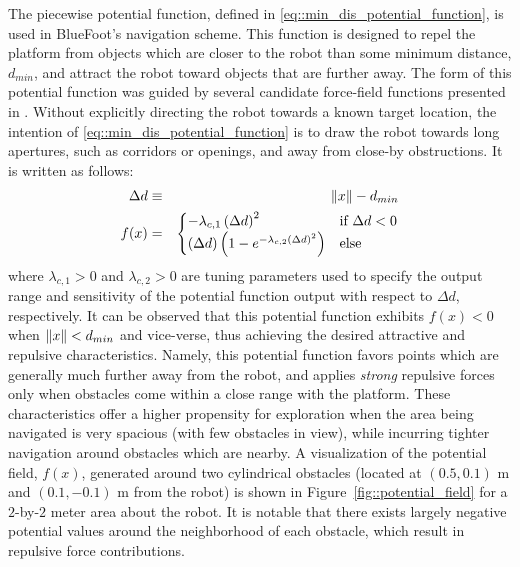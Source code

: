			The piecewise potential function, defined in \ref{eq::min_dis_potential_function}, is used in BlueFoot's navigation scheme. This function is designed to repel the platform from objects which are closer to the robot than some minimum distance, $d_{min}$, and attract the robot toward objects that are further away. The form of this potential function was guided by several candidate force-field functions presented in \cite{ArambulaCosio2004}. Without explicitly directing the robot towards a known target location, the intention of \ref{eq::min_dis_potential_function} is to draw the robot towards long apertures, such as corridors or openings, and away from close-by obstructions. It is written as follows:
				\begin{eqnarray}
					\Delta d &\equiv& \left\lVert x\right\rVert-d_{min} \nonumber \\
					f(x) &=& 
					\begin{cases}	
					 	 -\lambda_{c,1} \left(\Delta d\right)^{2} &  \text{if } \Delta d < 0 \\
						\left(\Delta d\right) \left( 1  - e^{ -  \lambda_{c,2} { \left(\Delta d\right) }^{2} } \right) 	&  \text{else}
					\end{cases}
				\label{eq::min_dis_potential_function}
				\end{eqnarray}
			where $\lambda_{c,1}>0$ and $\lambda_{c,2}>0$ are tuning parameters used to specify the output range and sensitivity of the potential function output with respect to $\Delta d$, respectively. It can be observed that this potential function exhibits $f(x)<0$ when $\left\lVert x\right\rVert < d_{min}$ and vice-verse, thus achieving the desired attractive and repulsive characteristics. Namely, this potential function favors points which are generally much further away from the robot, and applies \emph{strong} repulsive forces only when obstacles come within a close range with the platform. These characteristics offer a higher propensity for exploration when the area being navigated is very spacious (with few obstacles in view), while incurring tighter navigation around obstacles which are nearby. A visualization of the potential field, $f(x)$, generated around two cylindrical obstacles (located at $(0.5,0.1)\text{ m}$ and $(0.1,-0.1)\text{ m}$ from the robot) is shown in Figure~\ref{fig::potential_field} for a $2$-by-$2$ meter area about the robot. It is notable that there exists largely negative potential values around the neighborhood of each obstacle, which result in repulsive force contributions.

